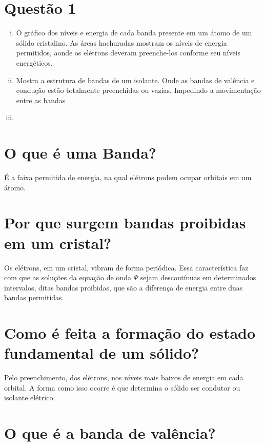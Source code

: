 \section*{Questão 1}
\label{q1}

\begin{enumerate}[i.]
   \item O  gráfico dos  níveis e  energia de cada  banda presente  em um
átomo de um  sólido cristalino. As áreas hachuradas  mostram os níveis
de energia permitidos, aonde os elétrons deveram preenche-los conforme
seu níveis energéticos.
   \item Mostra a  estrutura de bandas de um isolante.  Onde as bandas de
valência e condução estão  totalmente preenchidas ou vazias. Impedindo
a movimentação entre as bandas
   \item 
   \end{enumerate}
   
\section*{O que é uma Banda?}
\label{q2}

É a faixa permitida de energia, na qual elétrons podem ocupar orbitais
em um átomo.

\section*{Por que surgem bandas proibidas em um cristal?}
\label{q3}

Os  elétrons,  em   um  cristal,  vibram  de   forma  periódica.  Essa
característica faz com que as soluções da equação de onda $\Psi$ sejam
descontínuas em  determinados intervalos, ditas bandas  proibidas, que
são a diferença de energia entre duas bandas permitidas.

\section*{Como é feita a formação do estado fundamental de um sólido?}
\label{q4}

Pelo preenchimento, dos elétrons, nos níveis mais baixos de energia em
cada orbital.  A forma como isso  ocorre é que determina  o sólido ser
condutor ou isolante elétrico.

\section*{O que é a banda de valência?}
\label{q5}


